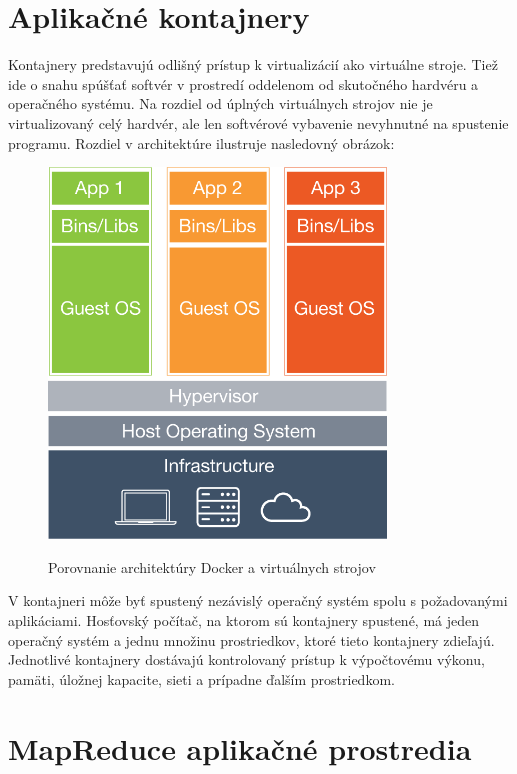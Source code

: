 \documentclass[11pt,final,oneside]{fithesis}
\begin{document}
\section{Aplikačné kontajnery}
Kontajnery predstavujú odlišný prístup k virtualizácií ako virtuálne stroje. Tiež ide o snahu spúšťať softvér v prostredí oddelenom od skutočného hardvéru a operačného systému. Na rozdiel od úplných virtuálnych strojov 
nie je virtualizovaný celý hardvér, ale len softvérové vybavenie nevyhnutné na spustenie programu. Rozdiel v architektúre ilustruje nasledovný obrázok: 
\begin{figure}[h]
\begin{center}
       \includegraphics[width=0.8\textwidth]{images/docker.png}
       \caption{Porovnanie architektúry Docker a virtuálnych strojov}\cite{docker}
\end{center}
\end{figure}
V kontajneri môže byť spustený nezávislý operačný systém spolu s požadovanými aplikáciami. Hosťovský počítač, na ktorom sú kontajnery spustené, má jeden operačný systém a jednu množinu prostriedkov, 
ktoré tieto kontajnery zdieľajú. Jednotlivé kontajnery dostávajú kontrolovaný prístup k výpočtovému výkonu, pamäti, úložnej kapacite, sieti a prípadne ďalším prostriedkom.




\section{MapReduce aplikačné prostredia}
\end{document}
